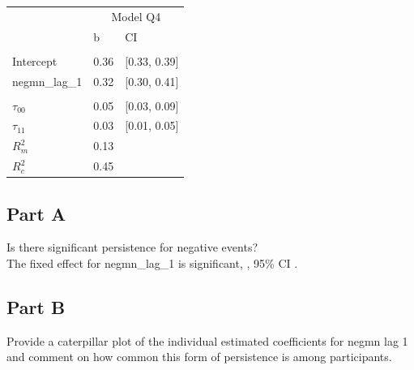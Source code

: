 \documentclass[]{article}
\begin{document}
\begin{table}[H]
\centering
\begin{tabular}{lll}
\toprule
\multicolumn{1}{c}{ } & \multicolumn{2}{c}{Model Q4} \\
\cmidrule(l{2pt}r{2pt}){2-3}
 & b & CI\\
\midrule
\addlinespace[0.3em]
\multicolumn{3}{l}{\textbf{Fixed}}\\
\hspace{1em}Intercept & 0.36 & [0.33, 0.39]\\
\hspace{1em}negmn\_lag\_1 & 0.32 & [0.30, 0.41]\\
\addlinespace[0.3em]
\multicolumn{3}{l}{\textbf{Random}}\\
\hspace{1em}$\tau_{00}$ & 0.05 & [0.03, 0.09]\\
\hspace{1em}$\tau_{11}$ & 0.03 & [0.01, 0.05]\\
$R^2_m$ & 0.13 & \\
$R^2_c$ & 0.45 & \\
\bottomrule
\end{tabular}
\end{table}

\subsection{Part A}\label{part-a-2}

Is there significant persistence for negative events?\\
The fixed effect for negmn\_lag\_1 is significant, , 95\% CI .

\subsection{Part B}\label{part-b-2}

Provide a caterpillar plot of the individual estimated coefficients for
negmn lag 1 and comment on how common this form of persistence is among
participants.
\end{document}
